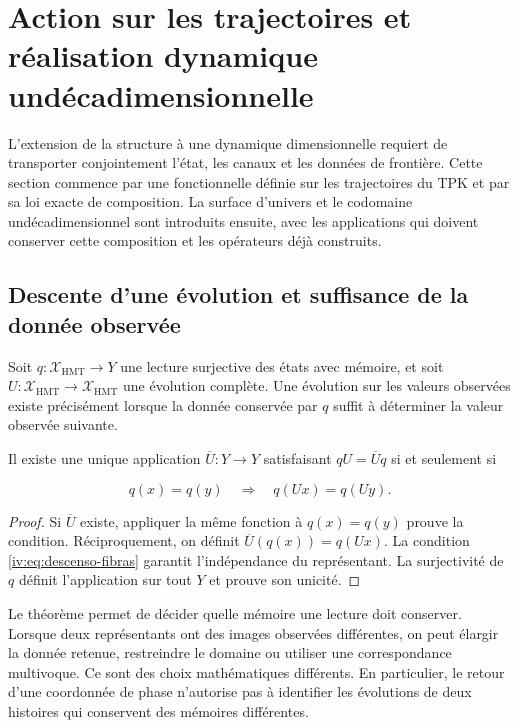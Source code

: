 \section{Action sur les trajectoires et réalisation dynamique undécadimensionnelle
}
\label{iv:accion-realizacion}

L’extension de la structure à une dynamique dimensionnelle requiert de
transporter conjointement l’état, les canaux et les données de
frontière. Cette section commence par une fonctionnelle définie sur
les trajectoires du TPK et par sa loi exacte de composition.
La surface d’univers et le codomaine undécadimensionnel sont
introduits ensuite, avec les applications qui doivent conserver cette
composition et les opérateurs déjà construits.


\subsection{Descente d’une évolution et suffisance de la donnée observée}

Soit \(q:\mathcal X_{\mathrm{HMT}}\to Y\) une lecture
surjective des états avec mémoire, et soit
\(U:\mathcal X_{\mathrm{HMT}}\to\mathcal X_{\mathrm{HMT}}\)
une évolution complète. Une évolution sur les valeurs
observées existe précisément lorsque la donnée conservée par
\(q\) suffit à déterminer la valeur observée suivante.

\begin{theorem}
\label{iv:thm:descenso-fibras}
Il existe une unique application \(\overline U:Y\to Y\)
satisfaisant \(qU=\overline Uq\) si et seulement si

\begin{equation}
 q(x)=q(y)\quad\Longrightarrow\quad q(Ux)=q(Uy).
 \label{iv:eq:descenso-fibras}
\end{equation}
\end{theorem}
\begin{proof}
Si \(\overline U\) existe, appliquer la même fonction à
\(q(x)=q(y)\) prouve la condition. Réciproquement, on
définit \(\overline U(q(x))=q(Ux)\). La condition
\eqref{iv:eq:descenso-fibras} garantit l’indépendance du
représentant. La surjectivité de \(q\) définit
l’application sur tout \(Y\) et prouve son unicité.
\end{proof}

Le théorème permet de décider quelle mémoire une
lecture doit conserver. Lorsque deux représentants ont des images observées
différentes, on peut élargir la donnée retenue, restreindre
le domaine ou utiliser une correspondance multivoque.
Ce sont des choix mathématiques différents. En particulier, le
retour d’une coordonnée de phase n’autorise pas à identifier
les évolutions de deux histoires qui conservent des mémoires
différentes.


